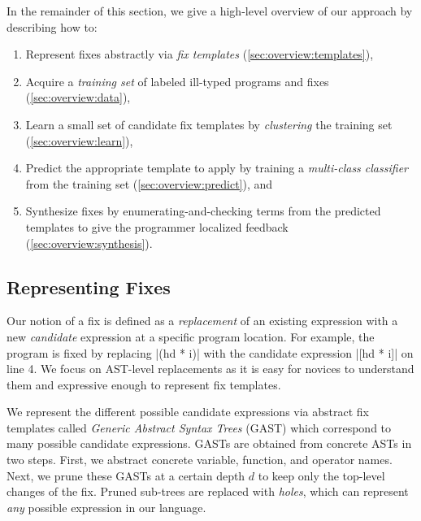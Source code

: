 In the remainder of this section, we give a high-level overview of our approach
by describing how to:

\begin{enumerate}

  \item Represent fixes abstractly via \emph{fix templates}
        (\autoref{sec:overview:templates}),

  \item Acquire a \emph{training set} of labeled ill-typed programs and fixes
        (\autoref{sec:overview:data}),

  \item Learn a small set of candidate fix templates by \emph{clustering}
        the training set (\autoref{sec:overview:learn}),

  \item Predict the appropriate template to apply by training a
        \emph{multi-class classifier} from the training set
        (\autoref{sec:overview:predict}), and

  \item Synthesize fixes by enumerating-and-checking terms from the
        predicted templates to give the programmer localized feedback
        (\autoref{sec:overview:synthesis}).
\end{enumerate}

\subsection{Representing Fixes}
\label{sec:overview:templates}

Our notion of a fix is defined as a \emph{replacement} of an existing expression
with a new \emph{candidate} expression at a specific program location. For
example, the \mbd program is fixed by replacing |(hd * i)| with the candidate
expression |[hd * i]| on line 4. We focus on AST-level replacements as it is
easy for novices to understand them and expressive enough to represent fix
templates.


%
We represent the different possible candidate expressions via abstract fix
templates called \emph{Generic Abstract Syntax Trees} (GAST) which correspond to
many possible candidate expressions.
%
GASTs are obtained from concrete ASTs in two steps.
%
First, we abstract concrete variable, function, and operator names.
%
Next, we prune these GASTs at a certain depth $d$ to keep only the top-level
changes of the fix. Pruned sub-trees are replaced with \emph{holes}, which can
represent \emph{any} possible expression in our language.


